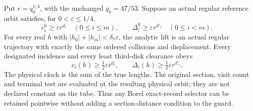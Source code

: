 \begin{theorem}
\label{thm:pt-physical}
Put $r=q_0^{1/4}$, with the unchanged $q_0=47/53$.  Suppose an actual
regular reference orbit satisfies, for $0<\varepsilon\le1/4$,
\begin{equation}\label{eq:pt-guarded-center}
 c_i^0\ge\varepsilon r^{d_i}\quad(0\le i\le m),\qquad
 \Delta_i^0\ge\varepsilon r^{d'_i}\quad(0\le i<m).
\end{equation}
For every real $h$ with $|h_0|+|h_m|<\delta_*\varepsilon$, the
analytic lift is an actual regular trajectory with exactly the same
ordered collisions and displacement.  Every designated incidence and
every least third-disk clearance obeys
\begin{equation}\label{eq:pt-half-margin}
 c_i(h)\ge\tfrac12\varepsilon r^{d_i},\qquad
 \Delta_i(h)\ge\tfrac12\varepsilon r^{d'_i}.
\end{equation}
The physical clock is the sum of the true lengths.  The original
section, visit count and terminal test are evaluated at the resulting
physical orbit; they are not declared constant on the tube.
Thus any Borel exact-record selector can be retained pointwise without
adding a section-distance condition to the guard.
\end{theorem}
